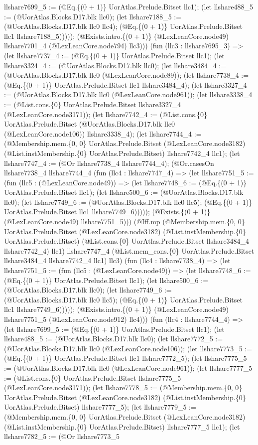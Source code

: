 \documentclass[11pt]{article}
\begin{document}
llshare7699\_5 := (@Eq.\{(0 + 1)\} UorAtlas.Prelude.Bitset llc1); (let llshare488\_5 := (@UorAtlas.Blocks.D17.blk llc0); (let llshare7188\_5 := (@UorAtlas.Blocks.D17.blk llc0 llc4); (@Eq.\{(0 + 1)\} UorAtlas.Prelude.Bitset llc1 llshare7188\_5))))); (@Exists.intro.\{(0 + 1)\} (@LexLeanCore.node49) llshare7701\_4 (@LexLeanCore.node794) llc3))) (fun (llc3 : llshare7695\_3) => (let llshare7737\_4 := (@Eq.\{(0 + 1)\} UorAtlas.Prelude.Bitset llc1); (let llshare3324\_4 := (@UorAtlas.Blocks.D17.blk llc0); (let llshare3484\_4 := (@UorAtlas.Blocks.D17.blk llc0 (@LexLeanCore.node89)); (let llshare7738\_4 := (@Eq.\{(0 + 1)\} UorAtlas.Prelude.Bitset llc1 llshare3484\_4); (let llshare3327\_4 := (@UorAtlas.Blocks.D17.blk llc0 (@LexLeanCore.node961)); (let llshare3338\_4 := (@List.cons.\{0\} UorAtlas.Prelude.Bitset llshare3327\_4 (@LexLeanCore.node3171)); (let llshare7742\_4 := (@List.cons.\{0\} UorAtlas.Prelude.Bitset (@UorAtlas.Blocks.D17.blk llc0 (@LexLeanCore.node106)) llshare3338\_4); (let llshare7744\_4 := (@Membership.mem.\{0, 0\} UorAtlas.Prelude.Bitset (@LexLeanCore.node3182) (@List.instMembership.\{0\} UorAtlas.Prelude.Bitset) llshare7742\_4 llc1); (let llshare7747\_4 := (@Or llshare7738\_4 llshare7744\_4); (@Or.casesOn llshare7738\_4 llshare7744\_4 (fun (llc4 : llshare7747\_4) => (let llshare7751\_5 := (fun (llc5 : (@LexLeanCore.node49)) => (let llshare7748\_6 := (@Eq.\{(0 + 1)\} UorAtlas.Prelude.Bitset llc1); (let llshare500\_6 := (@UorAtlas.Blocks.D17.blk llc0); (let llshare7749\_6 := (@UorAtlas.Blocks.D17.blk llc0 llc5); (@Eq.\{(0 + 1)\} UorAtlas.Prelude.Bitset llc1 llshare7749\_6))))); (@Exists.\{(0 + 1)\} (@LexLeanCore.node49) llshare7751\_5))) (@Iff.mp (@Membership.mem.\{0, 0\} UorAtlas.Prelude.Bitset (@LexLeanCore.node3182) (@List.instMembership.\{0\} UorAtlas.Prelude.Bitset) (@List.cons.\{0\} UorAtlas.Prelude.Bitset llshare3484\_4 llshare7742\_4) llc1) llshare7747\_4 (@List.mem\_cons.\{0\} UorAtlas.Prelude.Bitset llshare3484\_4 llshare7742\_4 llc1) llc3) (fun (llc4 : llshare7738\_4) => (let llshare7751\_5 := (fun (llc5 : (@LexLeanCore.node49)) => (let llshare7748\_6 := (@Eq.\{(0 + 1)\} UorAtlas.Prelude.Bitset llc1); (let llshare500\_6 := (@UorAtlas.Blocks.D17.blk llc0); (let llshare7749\_6 := (@UorAtlas.Blocks.D17.blk llc0 llc5); (@Eq.\{(0 + 1)\} UorAtlas.Prelude.Bitset llc1 llshare7749\_6))))); (@Exists.intro.\{(0 + 1)\} (@LexLeanCore.node49) llshare7751\_5 (@LexLeanCore.node912) llc4))) (fun (llc4 : llshare7744\_4) => (let llshare7699\_5 := (@Eq.\{(0 + 1)\} UorAtlas.Prelude.Bitset llc1); (let llshare488\_5 := (@UorAtlas.Blocks.D17.blk llc0); (let llshare7772\_5 := (@UorAtlas.Blocks.D17.blk llc0 (@LexLeanCore.node106)); (let llshare7773\_5 := (@Eq.\{(0 + 1)\} UorAtlas.Prelude.Bitset llc1 llshare7772\_5); (let llshare7775\_5 := (@UorAtlas.Blocks.D17.blk llc0 (@LexLeanCore.node961)); (let llshare7777\_5 := (@List.cons.\{0\} UorAtlas.Prelude.Bitset llshare7775\_5 (@LexLeanCore.node3171)); (let llshare7778\_5 := (@Membership.mem.\{0, 0\} UorAtlas.Prelude.Bitset (@LexLeanCore.node3182) (@List.instMembership.\{0\} UorAtlas.Prelude.Bitset) llshare7777\_5); (let llshare7779\_5 := (@Membership.mem.\{0, 0\} UorAtlas.Prelude.Bitset (@LexLeanCore.node3182) (@List.instMembership.\{0\} UorAtlas.Prelude.Bitset) llshare7777\_5 llc1); (let llshare7782\_5 := (@Or llshare7773\_5 
\end{document}
